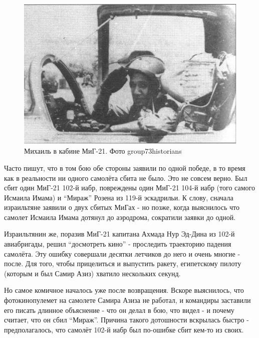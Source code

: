 \begin{figure}[h!tb] 
	\centering\includegraphics[scale=0.7]{History_Fenix/E3K1MfpzNMk.jpg}
	\caption{Михаиль в кабине МиГ-21. Фото group73historians}%
\end{figure}

Часто пишут, что в том бою обе стороны заявили по одной победе, в то время как в реальности ни одного самолёта сбита не было. Это не совсем верно. Был сбит один МиГ-21 102-й иабр, повреждены один МиГ-21 104-й иабр (того самого Исмаила Имама) и “Мираж” Розена из 119-й эскадрильи. К слову, сначала израильтяне заявили о двух сбитых МиГах - но позже, когда выяснилось что самолет Исмаила Имама дотянул до аэродрома, сократили заявки до одной.

Израильтянин же, поразив МиГ-21 капитана Ахмада Нур Эд-Дина из 102-й авиабригады, решил “досмотреть кино” - проследить траекторию падения самолёта. Эту ошибку совершали десятки летчиков до него и очень многие - после. Для того, чтобы прицелиться и выпустить ракету, египетскому пилоту (которым и был Самир Азиз) хватило нескольких секунд.

Но самое комичное началось уже после возвращения. Вскоре выяснилось, что фотокинопулемет на самолете Самира Азиза не работал, и командиры заставили его писать длинное объяснение - что он делал в бою, что видел - и почему считает, что он сбил “Мираж”. Причина такого дотошности вскрылась быстро - предполагалось, что самолёт 102-й иабр был по-ошибке сбит кем-то из своих.

